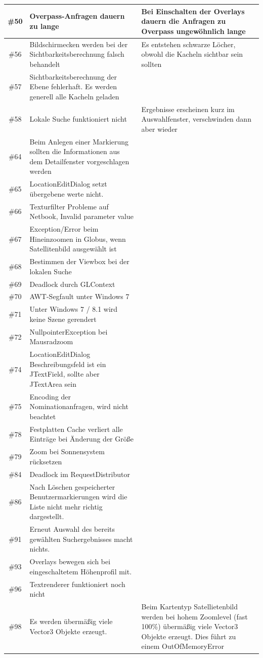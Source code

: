 \documentclass[10pt]{scrreprt}
\begin{document}
\begin{longtable}{|c|p{5.2cm}|p{8.2cm}|}
\hline
\#50 & Overpass-Anfragen dauern zu lange & Bei Einschalten der Overlays dauern die Anfragen zu Overpass ungewöhnlich lange \\
\hline
\#56 & Bildschirmecken werden bei der Sichtbarkeitsberechnung falsch behandelt & Es entstehen schwarze Löcher, obwohl die Kacheln sichtbar sein sollten \\
\hline
\#57 & Sichtbarkeitsberechnung der Ebene fehlerhaft. Es werden generell alle Kacheln geladen & \\
\hline
\#58 & Lokale Suche funktioniert nicht & Ergebnisse erscheinen kurz im Auswahlfenster, verschwinden dann aber wieder \\
\hline
\#64 & Beim Anlegen einer Markierung sollten die Informationen aus dem Detailfenster vorgeschlagen werden & \\
\hline
\#65 & LocationEditDialog setzt übergebene werte nicht. & \\
\hline
\#66 & Texturfilter Probleme auf Netbook, Invalid parameter value & \\
\hline
\#67 & Exception/Error beim Hineinzoomen in Globus, wenn Satellitenbild ausgewählt ist & \\
\hline
\#68 & Bestimmen der Viewbox bei der lokalen Suche & \\
\hline
\#69 & Deadlock durch GLContext & \\
\hline
\#70 & AWT-Segfault unter Windows 7 & \\
\hline
\#71 & Unter Windows 7 / 8.1 wird keine Szene gerendert & \\
\hline
\#72 & NullpointerException bei Mausradzoom & \\
\hline
\#74 & LocationEditDialog Beschreibungsfeld ist ein JTextField, sollte aber JTextArea sein & \\
\hline
\#75 & Encoding der Nominationanfragen, wird nicht beachtet & \\
\hline
\#78 & Festplatten Cache verliert alle Einträge bei Änderung der Größe & \\
\hline
\#79 & Zoom bei Sonnensystem rücksetzen & \\
\hline
\#84 & Deadlock im RequestDistributor & \\
\hline
\#86 & Nach Löschen gespeicherter Benutzermarkierungen wird die Liste nicht mehr richtig dargestellt. & \\
\hline
\#91 & Erneut Auswahl des bereits gewählten Suchergebnisses macht nichts. & \\
\hline
\#93 & Overlays bewegen sich bei eingeschaltetem Höhenprofil mit. & \\
\hline
\#96 & Textrenderer funktioniert noch nicht & \\
\hline
\#98 & Es werden übermäßig viele Vector3 Objekte erzeugt. & Beim Kartentyp Satellietenbild werden bei hohem Zoomlevel (fast 100\%) übermäßig viele Vector3 Objekte erzeugt. Dies führt zu einem OutOfMemoryError\\
\hline
\end{longtable}
\end{document}
